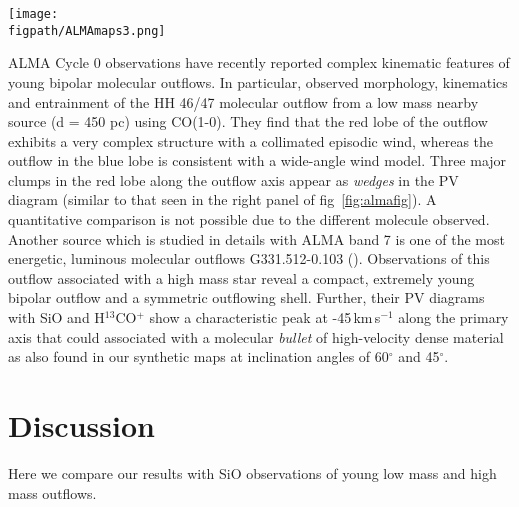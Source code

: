 \documentclass[useAMS,usenatbib]{mn2e}
\newcommand{\figpath}{/Users/bhargavvaidya/MyProject/work/Leeds_Uni/SiOJets_New/PAPER/PFIGS/}
\begin{document}
\begin{figure*}
 \texttt{[image: \\figpath/ALMAmaps3.png]}
 \caption{{\bf Left:} The integrated intensity map of SiO(2-1), (5-4)
   and (8-7). The heat map shows the 2-1 line intensity (in units of Jy$\,$kms$^{-1}$/beam), the blue contours show the J=8-7 line intensity and the green contours show the J=5-4 line intensity. {\bf Right:} The PV diagram taken along the axis of the jet (in units of Jy/beam), showing the higher J transitions highlighting the knots of the jet and broad emission at the bow shock. In both panels the ticks on the color bar represent the contour levels.}
\label{fig:almafig}
\end{figure*} 

ALMA Cycle 0 observations have recently reported complex kinematic
features of young bipolar molecular outflows. In particular,
\cite{Arce:2013p14902} observed morphology, kinematics and entrainment 
of the HH 46/47 molecular outflow from a low mass nearby
source (d = 450 pc) using CO(1-0). They find that the red
lobe of the outflow exhibits a very complex structure with a
collimated episodic wind, whereas the outflow in the blue lobe is
consistent with a
wide-angle wind model. Three major clumps in the red lobe along the
outflow axis appear as {\em{wedges}} in the PV
diagram (similar to that seen in the right panel of fig~\ref{fig:almafig}). 
A quantitative comparison is not possible due to the different
molecule observed. Another source which is studied in details with ALMA band 7 is
one of the most energetic, luminous molecular outflows
G331.512-0.103 (\citealt{Merello:2013p15066}). Observations of this outflow
associated with a high mass star reveal a compact, extremely young
bipolar outflow and a symmetric outflowing shell. Further, their PV
diagrams with SiO and H$^{13}$CO$^{+}$ show a characteristic peak at
-45\,km\,s$^{-1}$ along the primary axis that could associated with a 
molecular {\em bullet} of high-velocity dense material as also found in our
synthetic maps at inclination angles of 60$^{\circ}$ and 45$^{\circ}$.

 
\section{Discussion}
\label{sec:discussion}
Here we compare our results with SiO observations of young low
mass and high mass outflows.
\end{document}
